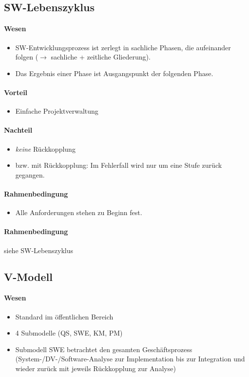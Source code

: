 \documentclass{scrreprt}
\begin{document}
\subsection{SW-Lebenszyklus}
\paragraph{Wesen}
\begin{itemize}
\item SW-Entwicklungsprozess ist zerlegt in sachliche Phasen, die aufeinander folgen ($\to$ sachliche + zeitliche Gliederung).
\item Das Ergebnis einer Phase ist Ausgangspunkt der folgenden Phase.
\end{itemize}

\paragraph{Vorteil}
\begin{itemize}
\item Einfache Projektverwaltung 
\end{itemize}

\paragraph{Nachteil}
\begin{itemize}
\item \emph{keine} Rückkopplung
\item bzw. mit Rückkopplung: Im Fehlerfall wird nur um eine Stufe zurück gegangen.
\end{itemize}

\paragraph{Rahmenbedingung}
\begin{itemize}
\item Alle Anforderungen stehen zu Beginn fest.
\end{itemize}

\paragraph{Rahmenbedingung} siehe SW-Lebenszyklus

\subsection{V-Modell}
\paragraph{Wesen} 
\begin{itemize}
\item Standard im öffentlichen Bereich
\item 4 Submodelle (QS, SWE, KM, PM)
\item Submodell SWE betrachtet den gesamten Geschäftsprozess (System-/DV-/Software-Analyse zur Implementation bis zur Integration und wieder zurück mit jeweils Rückkopplung zur Analyse)
\end{itemize}
\end{document}
